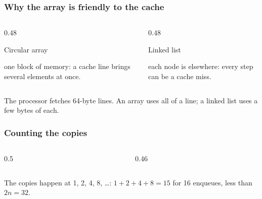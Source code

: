 \documentclass[aspectratio=169,10pt,compress]{beamer}
\begin{document}
\begin{frame}[t,fragile] \frametitle{Why the array is friendly to the cache}
  \begin{columns}[T]
    \begin{column}{0.48\textwidth}
      \begin{block}{Circular array}
        \small one block of memory: a cache line brings several elements at once.
      \end{block}
    \end{column}
    \begin{column}{0.48\textwidth}
      \begin{block}{Linked list}
        \small each node is elsewhere: every step can be a cache miss.
      \end{block}
    \end{column}
  \end{columns}
  \vspace{0.4em}
  \small The processor fetches 64-byte lines. An array uses all of a line; a linked list uses a few bytes of each.
\end{frame}





\begin{frame}[t,fragile] \frametitle{Counting the copies}
  \begin{columns}[T]
    \begin{column}{0.5\textwidth}
    \end{column}
    \begin{column}{0.46\textwidth}
    \end{column}
  \end{columns}
  \small The copies happen at 1, 2, 4, 8, \dots: $1+2+4+8 = 15$ for 16 enqueues, less than $2n = 32$.
\end{frame}
\end{document}
